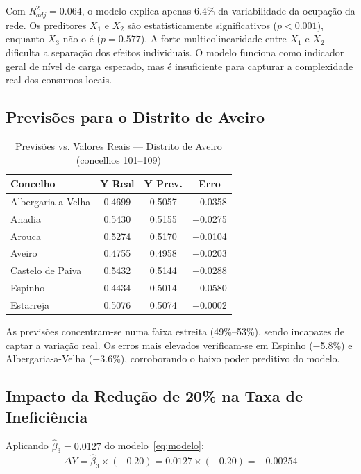 \documentclass[conference]{IEEEtran}
\begin{document}
Com $R^2_{adj} = 0.064$, o modelo explica apenas 6.4\% da variabilidade da ocupação da rede. Os preditores $X_1$ e $X_2$ são estatisticamente significativos ($p < 0.001$), enquanto $X_3$ não o é ($p = 0.577$). A forte multicolinearidade entre $X_1$ e $X_2$ dificulta a separação dos efeitos individuais. O modelo funciona como indicador geral de nível de carga esperado, mas é insuficiente para capturar a complexidade real dos consumos locais.

\subsection{Previsões para o Distrito de Aveiro}

\begin{table}[htbp]
\caption{Previsões vs. Valores Reais --- Distrito de Aveiro (concelhos 101--109)}
\label{tab:previsoes}
\centering
\begin{tabular}{lccc}
\hline
\textbf{Concelho}  & \textbf{Y Real} & \textbf{Y Prev.} & \textbf{Erro} \\
\hline
Albergaria-a-Velha & 0.4699 & 0.5057 & $-$0.0358 \\
Anadia             & 0.5430 & 0.5155 & $+$0.0275 \\
Arouca             & 0.5274 & 0.5170 & $+$0.0104 \\
Aveiro             & 0.4755 & 0.4958 & $-$0.0203 \\
Castelo de Paiva   & 0.5432 & 0.5144 & $+$0.0288 \\
Espinho            & 0.4434 & 0.5014 & $-$0.0580 \\
Estarreja          & 0.5076 & 0.5074 & $+$0.0002 \\
\hline
\end{tabular}
\end{table}

As previsões concentram-se numa faixa estreita (49\%--53\%), sendo incapazes de captar a variação real. Os erros mais elevados verificam-se em Espinho ($-$5.8\%) e Albergaria-a-Velha ($-$3.6\%), corroborando o baixo poder preditivo do modelo.

\subsection{Impacto da Redução de 20\% na Taxa de Ineficiência}

Aplicando $\hat{\beta}_3 = 0.0127$ do modelo~\eqref{eq:modelo}:
\[
\Delta Y = \hat{\beta}_3 \times (-0.20) = 0.0127 \times (-0.20) = -0.00254
\]
\end{document}
